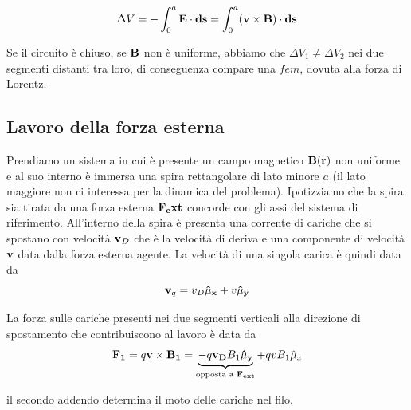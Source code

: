 \begin{equation*}
	\Delta V  = - \int_{0}^{a} \bold{E} \cdot \bold{ds} = \int_0^{a}(\bold{v} \times \bold{B}) \cdot \bold{ds}
\end{equation*}

Se il circuito \`e chiuso, se $\bold{B}$ non \`e uniforme, abbiamo che $\Delta V_1 \neq \Delta V_2$ nei due segmenti distanti tra loro, di conseguenza compare una $fem$, dovuta alla forza di Lorentz.

\subsection{Lavoro della forza esterna }

Prendiamo un sistema in cui \`e presente un campo magnetico $\bold{B}(\bold{r})$ non uniforme e al suo interno \`e  immersa una spira rettangolare di lato minore $a$ (il lato maggiore non ci interessa per la dinamica del problema). Ipotizziamo che la spira sia tirata da una forza esterna $\bold{F_ext}$ concorde con gli assi del 
sistema di riferimento. All'interno della spira \`e presenta una corrente di cariche che si spostano con velocit\`a $\bold{v}_D$ che \`e la velocit\`a di deriva e una componente di velocit\`a $\bold{v}$ data dalla forza esterna agente. La velocit\`a di una singola carica \`e quindi data da
\begin{equation*}
	\bold{v}_q =  v_D \bold{\hat{\mu}_x}  + v \bold{\hat{\mu}_y}
\end{equation*}

La forza sulle cariche presenti nei due segmenti verticali alla direzione di spostamento che contribuiscono al lavoro \`e data da 
\begin{equation*}
	\bold{F_1} = q \bold{v} \times \bold{B_1} = \underbrace{-q \bold{v_D}B_1 \bold{\hat{\mu}_y}}_{\text{opposta a } \bold{F_{ext}} } + qvB_1 \hat{\mu}_x
\end{equation*}

il secondo addendo determina il moto delle cariche nel filo.